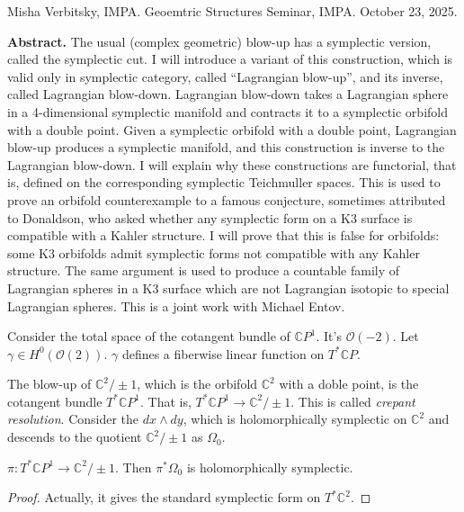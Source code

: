 \noindent
Misha Verbitsky, IMPA.
Geoemtric Structures Seminar, IMPA.
October 23, 2025.

\medskip\noindent
{\bf Abstract.} The usual (complex geometric)
blow-up has a symplectic
version, called the symplectic cut. I will
introduce a variant of this
construction, which is valid only in
symplectic category, called ``Lagrangian
blow-up'', and its inverse, called Lagrangian
blow-down. Lagrangian blow-down
takes a Lagrangian sphere in a 4-dimensional
symplectic manifold and contracts
it to a symplectic orbifold with a double
point. Given a symplectic orbifold
with a double point, Lagrangian blow-up
produces a symplectic manifold, and this
construction is inverse to the Lagrangian
blow-down. I will explain why these
constructions are functorial, that is,
defined on the corresponding symplectic
Teichmuller spaces. This is used to prove an
orbifold counterexample to a famous
conjecture, sometimes attributed to
Donaldson, who asked whether any symplectic
form on a K3 surface is compatible with a
Kahler structure. I will prove that
this is false for orbifolds: some K3
orbifolds admit symplectic forms not
compatible with any Kahler structure. The
same argument is used to produce a
countable family of Lagrangian spheres in a
K3 surface which are not Lagrangian
isotopic to special Lagrangian spheres. This
is a joint work with Michael Entov.



\medskip\noindent


Consider the total space of the cotangent
bundle of $\mathbb{C}P^1$.
It's $\mathcal{O}(-2)$.
Let $\gamma \in H^{0}(\mathcal{O}(2))$.
$\gamma$ defines a fiberwise linear function
on $T^*\mathbb{C}P$.

The blow-up of $\mathbb{C}^2/\pm 1$, which is
the orbifold $\mathbb{C}^2$ with
 a doble point, is the cotangent bundle $T^*
 \mathbb{C}P^1$.
That is,
$T^*\mathbb{C}P^1 \to \mathbb{C}^2/\pm 1$.
This is called {\it crepant resolution}.
Consider the $dx \wedge dy$, which is
holomorphically symplectic
on $\mathbb{C}^2$ and descends to the
quotient $\mathbb{C}^2/\pm 1$
as $\Omega_0$.

\begin{proposition}
\label{proposition-}
$\pi:T^*\mathbb{C}P^1 \to \mathbb{C}^2/\pm
1$.
Then $\pi^*\Omega_0$ is holomorphically
symplectic.
\end{proposition}

\begin{proof}
Actually, it gives the standard symplectic
form on $T^*\mathbb{C}^2$.
\end{proof}

